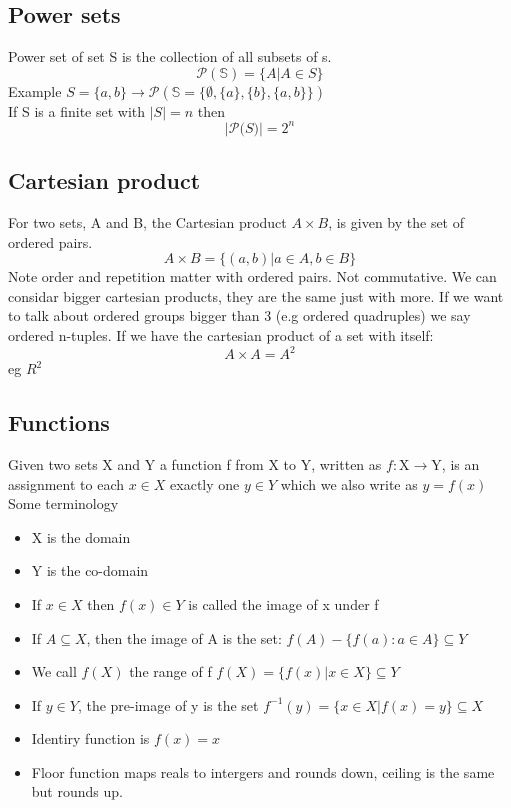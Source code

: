 \documentclass[a4paper, 11pt]{report}
\begin{document}
    \subsection{Power sets}
    Power set of set S is the collection of all subsets of s.
    \[\mathcal{P} (\mathbb{S}) = \{A | A \in S\}\]
    Example \(S = \{a, b\} \rightarrow \mathcal{P} (\mathbb{S} = \{\emptyset, \{a\},
    \{b\}, \{a, b\}\})\) \\
    If S is a finite set with \(|S| = n\) then \\
    \[|\mathcal{P} \mathbb(S)| = 2^{n}\]
    \subsection{Cartesian product}
    For two sets, A and B, the Cartesian product \(A \times B\), is given by the
    set of ordered pairs. \[A \times B = \{(a, b) | a \in A, b \in B\}\]
    Note order and repetition matter with ordered pairs. Not commutative. We can
    considar bigger cartesian products, they are the same just with more. If we
    want to talk about ordered groups bigger than 3 (e.g ordered quadruples) we
    say ordered n-tuples. If we have the cartesian product of a set with itself:
    \[A \times A = A^{2}\]
    eg \(R^{2}\)
    \subsection{Functions}
    Given two sets X and Y a function f from X to Y, written as \(f: \mathrm{X}
    \rightarrow \mathrm{Y}\), is an assignment to each \(x \in X\) exactly one
    \(y \in Y\) which we also write as \(y = f(x)\) \\
    Some terminology \\
    \begin{itemize}
        \item X is the domain
        \item Y is the co-domain
        \item If \(x \in X\) then \(f(x) \in Y\) is called the image of x under
            f
        \item If \(A \subseteq X\), then the image of A is the set: \(f(A) -
            \{f(a) : a \in A \} \subseteq Y\)
        \item We call \(f(X)\) the range of f \(f(X) = \{f(x) | x \in X\}
            \subseteq Y\)
        \item If \(y \in Y\), the pre-image of y is the set \(f^{-1}(y) = \{x
            \in X | f(x) = y\} \subseteq X\)
        \item Identiry function is \(f(x) = x\)
        \item Floor function maps reals to intergers and rounds down, ceiling is
            the same but rounds up.
    \end{itemize}
\end{document}
